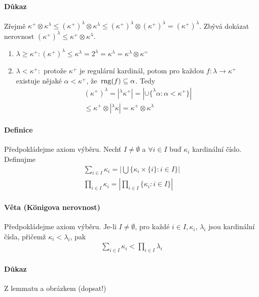 \documentclass[a4paper,12pt,titlepage]{article}
\begin{document}
\paragraph{Důkaz}
Zřejmě $\kappa^+ \otimes \kappa^\lambda \le (\kappa^+)^\lambda \otimes
\kappa^\lambda \le (\kappa^+)^\lambda \otimes (\kappa^+)^\lambda =
(\kappa^+)^\lambda$. Zbývá dokázat nerovnost $(\kappa^+)^\lambda \le \kappa^+
\otimes \kappa^\lambda$.
\begin{enumerate}
	\item  $\lambda \ge \kappa^+: (\kappa^+)^\lambda \le \kappa^\lambda =
	2^\lambda = \kappa^\lambda = \kappa^\lambda \otimes \kappa^=$
	\item $\lambda < \kappa^+: $ protože $\kappa^+$ je regulární kardinál, potom
	pro každou $f: \lambda \to \kappa^+$ existuje nějaké $\alpha < \kappa^+$, že
	$\operatorname*{\,rng}(f) \subseteq \alpha$. Tedy 
	\begin{align}
		(\kappa^+)^\lambda = | ^\lambda \kappa^+| = | \cup \{ ^\lambda \alpha :
		\alpha < \kappa^+ \} | \\
		\le \kappa^+ \otimes | ^\lambda \kappa| = \kappa^+ \otimes
		\kappa^\lambda
	\end{align}
\end{enumerate}
\paragraph{Definice}
Předpokládejme axiom výběru. Nechť $I \neq \emptyset$ a $\forall i \in I$ buď
$\kappa_i$ kardinální číslo. Definujme 
\begin{align}
	\sum_{i\in I} \kappa_i = \left| \bigcup \{\kappa_i \times \{i\}: i \in I
	\}\right| \\
	\prod_{i\in I} \kappa_i = \left| \prod_{i \in I} \{\kappa_i: i \in I\} \right |
\end{align}
\paragraph{Věta (Königova nerovnost)}
Předpokládejme axiom výběru. Je-li $I \neq \emptyset$, pro každé $i \in I,
\kappa_i$, $\lambda_i$ jsou kardinální čísla, přičemž $\kappa_i <\lambda_i$, pak 
\begin{align}
	\sum_{i\in I} \kappa_i < \prod_{i\in I} \lambda_i
\end{align}
\paragraph{Důkaz}
Z lemmatu a obrázkem (dopsat!)
\end{document}

